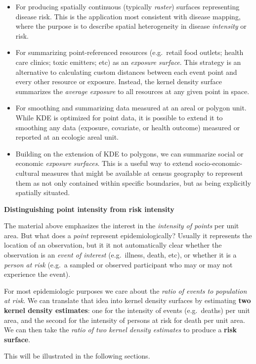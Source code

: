 \documentclass[
]{book}
\providecommand{\tightlist}{%
  \setlength{\itemsep}{0pt}\setlength{\parskip}{0pt}}
\newenvironment{rmdcaution}[1]
  {
  \begin{itemize}
  \renewcommand{\labelitemi}{
    \raisebox{-.7\height}[0pt][0pt]{
      {\setkeys{Gin}{width=3em,keepaspectratio}\texttt{[image: images/\#1]}}
    }
  }
  \setlength{\fboxsep}{1em}
  \begin{caution}
  \item
  }
  {
  \end{caution}
  \end{itemize}
  }
\begin{document}
\begin{itemize}
\tightlist
\item
  For producing spatially continuous (typically \emph{raster}) surfaces representing disease risk. This is the application most consistent with disease mapping, where the purpose is to describe spatial heterogeneity in disease \emph{intensity} or risk.
\item
  For summarizing point-referenced resources (e.g.~retail food outlets; health care clinics; toxic emitters; etc) as an \emph{exposure surface}. This strategy is an alternative to calculating custom distances between each event point and every other resource or exposure. Instead, the kernel density surface summarizes the \emph{average exposure} to all resources at any given point in space.
\item
  For smoothing and summarizing data measured at an areal or polygon unit. While KDE is optimized for point data, it is possible to extend it to smoothing any data (exposure, covariate, or health outcome) measured or reported at an ecologic areal unit.
\item
  Building on the extension of KDE to polygons, we can summarize social or economic \emph{exposure surfaces}. This is a useful way to extend socio-economic-cultural measures that might be available at census geography to represent them as not only contained within specific boundaries, but as being explicitly spatially situated.
\end{itemize}

\begin{rmdcaution}{caution}
\textbf{Distinguishing point intensity from risk intensity}

The material above emphasizes the interest in the \emph{intensity of points} per unit area. But what does a \emph{point} represent epidemiologically? Usually it represents the location of an observation, but it it not automatically clear whether the observation is an \emph{event of interest} (e.g.~illness, death, etc), or whether it is a \emph{person at risk} (e.g.~a sampled or observed participant who may or may not experience the event).

For most epidemiologic purposes we care about the \emph{ratio of events to population at risk}. We can translate that idea into kernel density surfaces by estimating \textbf{two kernel density estimates}: one for the intensity of events (e.g.~deaths) per unit area, and the second for the intensity of persons at risk for death per unit area. We can then take the \emph{ratio of two kernel density estimates} to produce a \textbf{risk surface}.

This will be illustrated in the following sections.

\end{rmdcaution}
\end{document}
